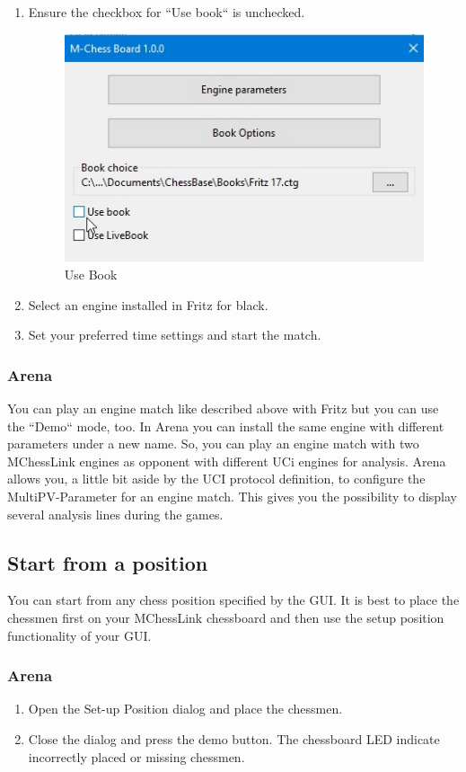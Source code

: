 \documentclass[11pt,a4paper]{article}
\begin{document}
\begin{enumerate}
	\item Ensure the checkbox for ``Use book`` is unchecked.
	\begin{figure}[H]
		\centering
		\includegraphics[scale=0.6]{fritz_engineusebook.jpg}
		\caption{Use Book}
		\label{fig:FritzUseBook}
	\end{figure}
	\item Select an engine installed in Fritz for black.
	\item Set your preferred time settings and start the match.	
\end{enumerate}
\subsubsection{Arena}
You can play an engine match like described above with Fritz but you can use the ``Demo`` mode, too. In Arena you can install the same engine with different parameters under a new name. So, you can play an engine match with two MChessLink engines as opponent with different UCi engines for analysis. Arena allows you, a little bit aside by the UCI protocol definition, to configure the MultiPV-Parameter for an engine match. This gives you the possibility to display several analysis lines during the games.

\subsection{Start from a position}
You can start from any chess position specified by the GUI. It is best to place the chessmen first on your MChessLink chessboard and then use the setup position functionality of your GUI.
\subsubsection{Arena}
\begin{enumerate}
  \item Open the Set-up Position dialog and place the chessmen.
  \item Close the dialog and press the demo button. The chessboard LED indicate incorrectly placed or missing chessmen.
\end{enumerate}
\end{document}
